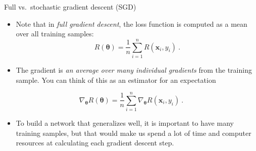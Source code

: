 \documentclass[
  10pt,
  ignorenonframetext,
  twocolumn]{beamer}
\providecommand{\tightlist}{%
  \setlength{\itemsep}{0pt}\setlength{\parskip}{0pt}}
\begin{document}
\begin{frame}
\begin{block}{Full vs.~stochastic gradient descent (SGD)}
\label{full-vs.-stochastic-gradient-descent-sgd}
\(~\)

\begin{itemize}
\item
  Note that in \emph{full gradient descent}, the loss function is
  computed as a mean over all training samples: \[
  R({\boldsymbol \theta})=\frac{1}{n}\sum_{i=1}^n R({\boldsymbol x}_i, y_i) \ .
  \]
\item
  The gradient is \emph{an average over many individual gradients} from
  the training sample. You can think of this as an estimator for an
  expectation
\end{itemize}

\[
\nabla_{\boldsymbol \theta} R({\boldsymbol \theta})=\frac{1}{n}\sum_{i=1}^n \nabla_{\boldsymbol \theta} R({\boldsymbol x}_i, y_i) \ .
\]

\begin{itemize}
\tightlist
\item
  To build a network that generalizes well, it is important to have many
  training samples, but that would make us spend a lot of time and
  computer resources at calculating each gradient descent step.
\end{itemize}
\end{block}
\end{frame}
\end{document}
